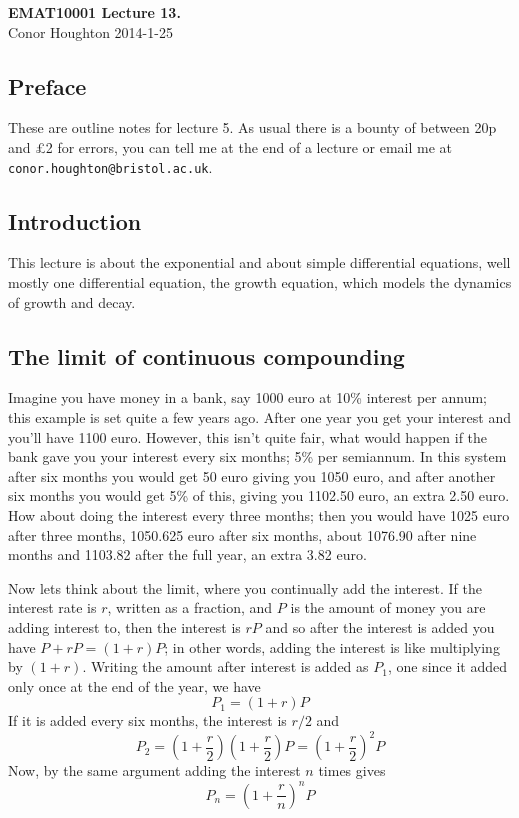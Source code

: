 \documentclass[12pt]{article}
\begin{document}
\begin{center}
{\bf EMAT10001 Lecture 13.}\\[1cm]{} Conor Houghton 2014-1-25
\end{center}
\subsection*{Preface} 
These are outline notes for lecture 5. As usual there is a bounty of
between 20p and \pounds 2 for errors, you can tell me at the end of a
lecture or email me at \texttt{conor.houghton{@}bristol.ac.uk}.

\subsection*{Introduction}

This lecture is about the exponential and about simple differential
equations, well mostly one differential equation, the growth equation,
which models the dynamics of growth and decay.

\subsection*{The limit of continuous compounding}
Imagine you have money in a bank, say 1000 euro at 10\% interest per
annum; this example is set quite a few years ago. After one year you
get your interest and you'll have 1100 euro. However, this isn't quite
fair, what would happen if the bank gave you your interest every six
months; 5\% per semiannum. In this system after six months you would
get 50 euro giving you 1050 euro, and after another six months you
would get 5\% of this, giving you 1102.50 euro, an extra 2.50
euro. How about doing the interest every three months; then you would
have 1025 euro after three months, 1050.625 euro after six months,
about 1076.90 after nine months and 1103.82 after the full year, an
extra 3.82 euro.

Now lets think about the limit, where you continually add the
interest. If the interest rate is $r$, written as a fraction, and $P$
is the amount of money you are adding interest to, then the interest
is $rP$ and so after the interest is added you have $P+rP=(1+r)P$; in
other words, adding the interest is like multiplying by $(1+r)$. Writing the amount after interest is added as $P_1$, one since it added only once at the end of the year, we have
\begin{equation}
P_1=(1+r)P
\end{equation}
If it is added every six months, the interest is $r/2$ and
\begin{equation}
P_2=\left(1+\frac{r}{2}\right)\left(1+\frac{r}{2}\right)P=\left(1+\frac{r}{2}\right)^2P
\end{equation}
Now, by the same argument adding the interest $n$ times gives 
\begin{equation}
P_n=\left(1+\frac{r}{n}\right)^nP
\end{equation}
\end{document}
